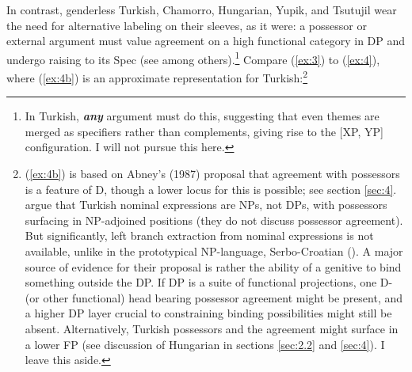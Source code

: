 \documentclass[output=paper
,modfonts
,nonflat]{langsci/langscibook}
\begin{document}
In contrast, genderless Turkish, Chamorro, Hungarian, Yupik, and Tsutujil wear the need for alternative labeling on their sleeves, as it were: a possessor or external argument must value agreement on a high functional category in DP and undergo raising to its Spec (see \citealt{Abney1987} among others).\footnote{In Turkish, \textit{\textbf{any}} argument must do this, suggesting that even themes are merged as specifiers rather than complements, giving rise to the [XP, YP] configuration. I will not pursue this here.} Compare (\ref{ex:3}) to (\ref{ex:4}), where (\ref{ex:4b}) is an approximate representation for Turkish:\footnote{(\ref{ex:4b}) is based on Abney's (1987) proposal that agreement with possessors is a feature of D, though a lower locus for this is possible; see section \ref{sec:4}. \citet{Bošković_Sener2014} argue that Turkish nominal expressions are NPs, not DPs, with possessors surfacing in NP-adjoined positions (they do not discuss possessor agreement). But significantly, left branch extraction from nominal expressions is not available, unlike in the prototypical NP-language, Serbo-Croatian (\citealt{Bošković2005}). A major source of evidence for their proposal is rather the ability of a genitive to bind something outside the DP. If DP is a suite of functional projections, one D- (or other functional) head bearing possessor agreement might be present, and a higher DP layer crucial to constraining binding possibilities might still be absent. Alternatively, Turkish possessors and the agreement might surface in a lower FP (see discussion of Hungarian in sections \ref{sec:2.2} and \ref{sec:4}). I leave this aside.}
\end{document}
